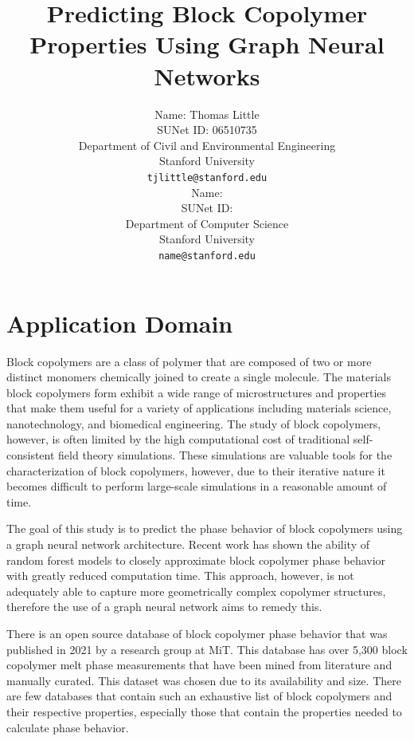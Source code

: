 \documentclass{article}
\title{
  Predicting Block Copolymer Properties Using Graph Neural Networks \\
}
\author{
  Name: Thomas Little\\
  SUNet ID: 06510735\\
  Department of Civil and Environmental Engineering \\
  Stanford University \\
  \texttt{tjlittle@stanford.edu} \\
  \And
  Name: \\
  SUNet ID: \\
  Department of Computer Science \\
  Stanford University \\
  \texttt{name@stanford.edu} \\
}
\begin{document}
\maketitle



\section{Application Domain}
Block copolymers are a class of polymer that are composed of two or more distinct monomers chemically joined to create a single molecule. The materials block copolymers form exhibit a wide range of microstructures and properties that make them useful for a variety of applications including materials science, nanotechnology, and biomedical engineering. The study of block copolymers, however, is often limited by the high computational cost of traditional self-consistent field theory simulations. These simulations are valuable tools for the characterization of block copolymers, however, due to their iterative nature it becomes difficult to perform large-scale simulations in a reasonable amount of time.

The goal of this study is to predict the phase behavior of block copolymers using a graph neural network architecture. Recent work has shown the ability of random forest models to closely approximate block copolymer phase behavior with greatly reduced computation time\cite{RandForest}. This approach, however, is not adequately able to capture more geometrically complex copolymer structures, therefore the use of a graph neural network aims to remedy this.

There is an open source database of block copolymer phase behavior that was published in 2021 by a research group at MiT\cite{BCDB}. This database has over 5,300 block copolymer melt phase measurements that have been mined from literature and manually curated. This dataset was chosen due to its availability and size. There are few databases that contain such an exhaustive list of block copolymers and their respective properties, especially those that contain the properties needed to calculate phase behavior.
\end{document}
